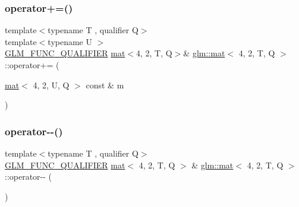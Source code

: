\mbox{\label{structglm_1_1mat_3_014_00_012_00_01_t_00_01_q_01_4_a3a85d5dbf4a5202ffc6ddaeb8e8d557e}} 
\subsubsection{\texorpdfstring{operator+=()}{operator+=()}\hspace{0.1cm}{\footnotesize\ttfamily [4/4]}}
{\footnotesize\ttfamily template$<$typename T , qualifier Q$>$ \\
template$<$typename U $>$ \\
\mbox{\hyperlink{setup_8hpp_a33fdea6f91c5f834105f7415e2a64407}{G\+L\+M\+\_\+\+F\+U\+N\+C\+\_\+\+Q\+U\+A\+L\+I\+F\+I\+ER}} \mbox{\hyperlink{structglm_1_1mat}{mat}}$<$4, 2, T, Q$>$\& \mbox{\hyperlink{structglm_1_1mat}{glm\+::mat}}$<$ 4, 2, T, Q $>$\+::operator+= (\begin{DoxyParamCaption}\item[{\mbox{\hyperlink{structglm_1_1mat}{mat}}$<$ 4, 2, U, Q $>$ const \&}]{m }\end{DoxyParamCaption})}

\mbox{\label{structglm_1_1mat_3_014_00_012_00_01_t_00_01_q_01_4_adffff37695848dddf217654fbbd42862}} 
\subsubsection{\texorpdfstring{operator-\/-\/()}{operator--()}\hspace{0.1cm}{\footnotesize\ttfamily [1/2]}}
{\footnotesize\ttfamily template$<$typename T , qualifier Q$>$ \\
\mbox{\hyperlink{setup_8hpp_a33fdea6f91c5f834105f7415e2a64407}{G\+L\+M\+\_\+\+F\+U\+N\+C\+\_\+\+Q\+U\+A\+L\+I\+F\+I\+ER}} \mbox{\hyperlink{structglm_1_1mat}{mat}}$<$ 4, 2, T, Q $>$ \& \mbox{\hyperlink{structglm_1_1mat}{glm\+::mat}}$<$ 4, 2, T, Q $>$\+::operator-\/-\/ (\begin{DoxyParamCaption}{ }\end{DoxyParamCaption})}

